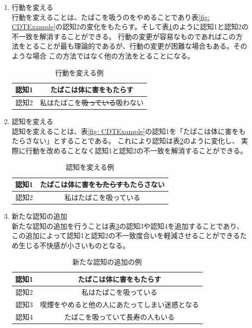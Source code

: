 \documentclass{kuisthesis}
\begin{document}
\begin{enumerate}
  \item 行動を変える \\
  行動を変えることは、たばこを吸うのをやめることであり表\ref{fig: CDTExample}の認知2の変化をもたらす。そして表\ref{fig: ReduceDissonanceAction}のように認知1と認知2の不一致を解消することができる。
行動の変更が容易なものであればこの方法をとることが最も理論的であるが、行動の変更が困難な場合もある。そのような場合
この方法ではなく他の方法をとることになる。
  \begin{table}[H]
    \centering
    \caption{行動を変える例}
    \label{fig: ReduceDissonanceAction}
    \begin{tabular}{c|c}

        認知1 & たばこは体に害をもたらす  \\ \hline
        認知2 & 私はたばこを\sout{吸っている}吸わない \\
    \end{tabular}
\end{table}
 \item 認知を変える \\
  認知を変えることは、表\ref{fig: CDTExample}の認知1を「たばこは体に害をもたらさない」とすることである。
  これにより認知は表\ref{fig: ReduceDissonanceChange}のように変化し、
  実際に行動を改めることなく認知1と認知2の不一致を解消することができる。
  \begin{table}[H]
    \centering
    \caption{認知を変える例}
    \label{fig: ReduceDissonanceChange}
    \begin{tabular}{c|c}
        認知1 & たばこは体に害を\sout{もたらす}もたらさない  \\ \hline
        認知2 & 私はたばこを吸っている \\
    \end{tabular}
    
  \end{table}

  \item 新たな認知の追加 \\
  新たな認知の追加を行うことは表\ref{fig: CDTExample2}の認知3や認知4を追加することであり、
この追加によって認知1と認知2の不一致度合いを軽減させることができるため生じる不快感が小さいものとなる。
\begin{table}[H]
  \centering
  \caption{新たな認知の追加の例}
  \label{fig: CDTExample2}
  \begin{tabular}{c|c}

      認知1 & たばこは体に害をもたらす  \\ \hline
      認知2 & 私はたばこを吸っている \\ \hline
      認知3 & 喫煙をやめると他の人にあたってしまい迷惑となる \\ \hline
      認知4 & たばこを吸っていて長寿の人もいる \\ 
  \end{tabular}


\end{table}
\end{enumerate}
\end{document}
